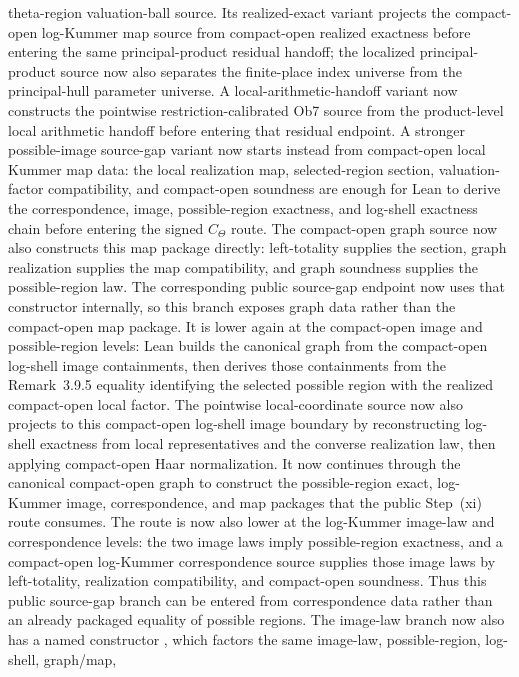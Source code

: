 \documentclass[11pt]{article}
\theoremstyle{plain}
\theoremstyle{definition}
\theoremstyle{remark}
\begin{document}
theta-region valuation-ball source.  Its realized-exact variant projects the
compact-open log-Kummer map source from compact-open realized exactness before
entering the same principal-product residual handoff; the localized
principal-product source now also separates the finite-place index universe
from the principal-hull parameter universe.  A local-arithmetic-handoff variant
now constructs the pointwise restriction-calibrated Ob7 source from the
product-level local arithmetic handoff before entering that residual endpoint.
A stronger possible-image source-gap variant now starts instead from
compact-open local Kummer map data: the local realization map, selected-region
section, valuation-factor compatibility, and compact-open soundness are enough
for Lean to derive the correspondence, image, possible-region exactness, and
log-shell exactness chain before entering the signed \(C_\Theta\) route.  The
compact-open graph source now also constructs this map package directly:
left-totality supplies the section, graph realization supplies the map
compatibility, and graph soundness supplies the possible-region law.  The
corresponding public source-gap endpoint now uses that constructor internally,
so this branch exposes graph data rather than the compact-open map package.
It is lower again at the compact-open image and possible-region levels: Lean
builds the canonical graph from the compact-open log-shell image containments,
then derives those containments from the Remark~3.9.5 equality identifying the
selected possible region with the realized compact-open local factor.  The
pointwise local-coordinate source now also projects to this compact-open
log-shell image boundary by reconstructing log-shell exactness from local
representatives and the converse realization law, then applying compact-open
Haar normalization.  It now continues through the canonical compact-open graph
to construct the possible-region exact, log-Kummer image, correspondence, and
map packages that the public Step~(xi) route consumes.
The route is now also lower at the log-Kummer image-law and correspondence
levels: the two image laws imply possible-region exactness, and a compact-open
log-Kummer correspondence source supplies those image laws by left-totality,
realization compatibility, and compact-open soundness.  Thus this public
source-gap branch can be entered from correspondence data rather than an
already packaged equality of possible regions.  The image-law branch now also
has a named constructor
\texttt{},
which factors the same image-law, possible-region, log-shell, graph/map,
\end{document}
